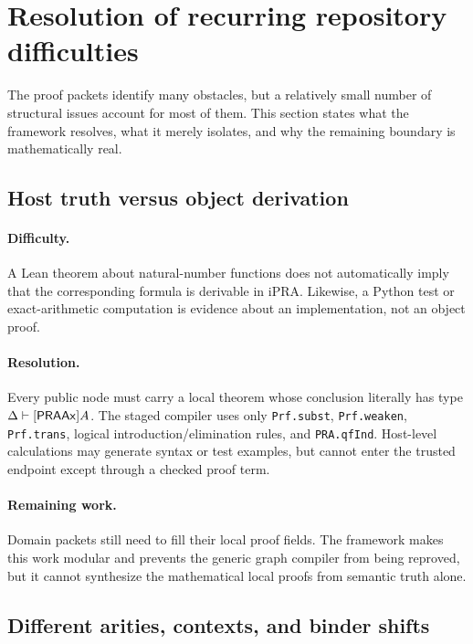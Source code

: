 \section{Resolution of recurring repository difficulties}
\label{sec:difficulties}

The proof packets identify many obstacles, but a relatively small number of structural issues account for
most of them.  This section states what the framework resolves, what it merely isolates, and why the
remaining boundary is mathematically real.

\subsection{Host truth versus object derivation}

\paragraph{Difficulty.}
A Lean theorem about natural-number functions does not automatically imply that the corresponding formula
is derivable in iPRA.  Likewise, a Python test or exact-arithmetic computation is evidence about an
implementation, not an object proof.

\paragraph{Resolution.}
Every public node must carry a local theorem whose conclusion literally has type
\(\Delta\vdash[\mathsf{PRAAx}]A\).  The staged compiler uses only \texttt{Prf.subst},
\texttt{Prf.weaken}, \texttt{Prf.trans}, logical introduction/elimination rules, and
\texttt{PRA.qfInd}.  Host-level calculations may generate syntax or test examples, but cannot enter the
trusted endpoint except through a checked proof term.

\paragraph{Remaining work.}
Domain packets still need to fill their local proof fields.  The framework makes this work modular and
prevents the generic graph compiler from being reproved, but it cannot synthesize the mathematical local
proofs from semantic truth alone.

\subsection{Different arities, contexts, and binder shifts}


